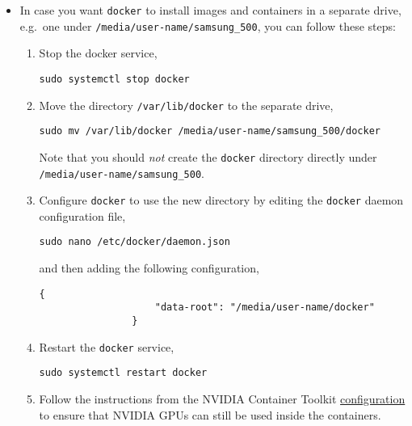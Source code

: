 \documentclass[12pt, a4paper]{scrbook}
\numberwithin{equation}{section}
\theoremstyle{definition}
\theoremstyle{definition}
\begin{document}
	\begin{itemize}
		\item In case you want \texttt{docker} to install images and containers in a separate drive, e.g.~one under \texttt{/media/user-name/samsung_500}, you can follow these steps:
		
		\begin{enumerate}
			\item Stop the docker service,
			
			\begin{lstlisting}[style=mystylebash, xleftmargin=\parindent]
				sudo systemctl stop docker
			\end{lstlisting}
			
			\item Move the directory \texttt{/var/lib/docker} to the separate drive,
			
			\begin{lstlisting}[style=mystylebash, xleftmargin=\parindent]
				sudo mv /var/lib/docker /media/user-name/samsung_500/docker
			\end{lstlisting}
			
			Note that you should \textit{not} create the \texttt{docker} directory directly under \texttt{/media/user-name/samsung_500}.
			
			\item Configure \texttt{docker} to use the new directory by editing the \texttt{docker} daemon configuration file,
			
			\begin{lstlisting}[style=mystylebash, xleftmargin=\parindent]
				sudo nano /etc/docker/daemon.json
			\end{lstlisting}
			
			and then adding the following configuration,
			
			\begin{lstlisting}[style=mystylebash, xleftmargin=\parindent]
				{
					"data-root": "/media/user-name/docker"
				}
			\end{lstlisting}
			
			\item Restart the \texttt{docker} service, 
			
			\begin{lstlisting}[style=mystylebash, xleftmargin=\parindent]
				sudo systemctl restart docker
			\end{lstlisting}	
			
			\item Follow the instructions from the NVIDIA Container Toolkit \href{https://docs.nvidia.com/datacenter/cloud-native/container-toolkit/latest/install-guide.html#configuring-docker}{configuration} to ensure that NVIDIA GPUs can still be used inside the containers.
			
		\end{enumerate}
		
	\end{itemize}
	
\end{document}
